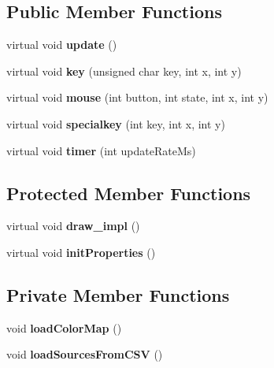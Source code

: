 \subsection*{Public Member Functions}
\begin{DoxyCompactItemize}
\item 
virtual void {\bfseries update} ()\label{classSoundfieldViewer_1_1ShaderSoundfieldViewerGreen_a922f7a60fe33928ea4c76861e0a4fd26}

\item 
virtual void {\bfseries key} (unsigned char key, int x, int y)\label{classSoundfieldViewer_1_1ShaderSoundfieldViewerGreen_af3e1e4a540247860dea16cd2392b05e5}

\item 
virtual void {\bfseries mouse} (int button, int state, int x, int y)\label{classSoundfieldViewer_1_1ShaderSoundfieldViewerGreen_abbc31669c8ce6639603e891885330798}

\item 
virtual void {\bfseries specialkey} (int key, int x, int y)\label{classSoundfieldViewer_1_1ShaderSoundfieldViewerGreen_ac13a3591c628d87f01df75a0bf0f730f}

\item 
virtual void {\bfseries timer} (int update\-Rate\-Ms)\label{classSoundfieldViewer_1_1ShaderSoundfieldViewerGreen_a7d1b142f763b43dce94d3935b9ecaf4e}

\end{DoxyCompactItemize}
\subsection*{Protected Member Functions}
\begin{DoxyCompactItemize}
\item 
virtual void {\bfseries draw\-\_\-impl} ()\label{classSoundfieldViewer_1_1ShaderSoundfieldViewerGreen_a13c305166a5e1310edfeed817e4fdcf9}

\item 
virtual void {\bfseries init\-Properties} ()\label{classSoundfieldViewer_1_1ShaderSoundfieldViewerGreen_a571762f2fbc8d78ad95ae365aae5d19c}

\end{DoxyCompactItemize}
\subsection*{Private Member Functions}
\begin{DoxyCompactItemize}
\item 
void {\bfseries load\-Color\-Map} ()\label{classSoundfieldViewer_1_1ShaderSoundfieldViewerGreen_aa3b7c9f19cf5e6dfaae4bff40f03884c}

\item 
void {\bfseries load\-Sources\-From\-C\-S\-V} ()\label{classSoundfieldViewer_1_1ShaderSoundfieldViewerGreen_aa7e4ceee222bc18df142a37eb9d7d24f}

\end{DoxyCompactItemize}
